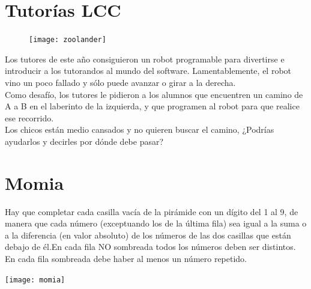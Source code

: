 \documentclass[12pt, a4paper]{article}
\begin{document}
\section*{Tutorías LCC}
\begin{figure}
\vspace{-1.35em}
\texttt{[image: zoolander]}
\end{figure}

Los tutores de este año consiguieron un robot programable para divertirse
e introducir a los tutorandos al mundo del software. Lamentablemente,
el robot vino un poco fallado y sólo puede avanzar o girar a la derecha.\\

Como desafío, los tutores le pidieron a los alumnos que encuentren un
camino de A a B en el laberinto de la izquierda, y que programen al robot
para que realice ese recorrido.\\

Los chicos están medio cansados y no quieren buscar el camino, ¿Podrías
ayudarlos y decirles por dónde debe pasar?

\section*{Momia}

Hay que completar cada casilla vacía de la pirámide con un dígito del 1 al 9,
de manera que cada número (exceptuando los de la última fila) sea igual a la suma
o a la diferencia (en valor absoluto) de los números de las dos casillas que
están debajo de él.En cada fila NO sombreada todos los números deben ser distintos.
En cada fila sombreada debe haber al menos un número repetido.

\begin{centering}
\texttt{[image: momia]}
\end{centering}

\end{document}
